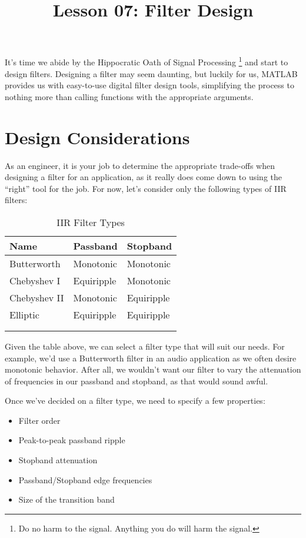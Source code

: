 \documentclass{article}
\title{Lesson 07: Filter Design}
\begin{document}
\renderTitle

It's time we abide by the Hippocratic Oath of Signal Processing%
\footnote{Do no harm to the signal.  Anything you do will harm the
signal.} and start to design filters.  Designing a filter may seem
daunting, but luckily for us, MATLAB provides us with easy-to-use
digital filter design tools, simplifying the process to nothing more than
calling functions with the appropriate arguments.

\section{Design Considerations}

As an engineer, it is your job to determine the appropriate trade-offs
when designing a filter for an application, as it really does come down
to using the \enquote{right} tool for the job.  For now, let's consider
only the following types of IIR filters:

\begin{longtable}{lll}
\toprule
Name & Passband & Stopband \\
\midrule
Butterworth  & Monotonic  & Monotonic \\
Chebyshev I  & Equiripple & Monotonic \\
Chebyshev II & Monotonic  & Equiripple \\
Elliptic     & Equiripple & Equiripple \\
\bottomrule
\\
\caption{IIR Filter Types}
\end{longtable}

Given the table above, we can select a filter type that will suit our
needs.  For example, we'd use a Butterworth filter in an audio
application as we often desire monotonic behavior.  After all, we
wouldn't want our filter to vary the attenuation of frequencies in our
passband and stopband, as that would sound awful.

Once we've decided on a filter type, we need to specify a few
properties:

\begin{itemize}
	\item
		Filter order

	\item
		Peak-to-peak passband ripple

	\item
		Stopband attenuation

	\item
		Passband/Stopband edge frequencies

	\item
		Size of the transition band
\end{itemize}
\end{document}

